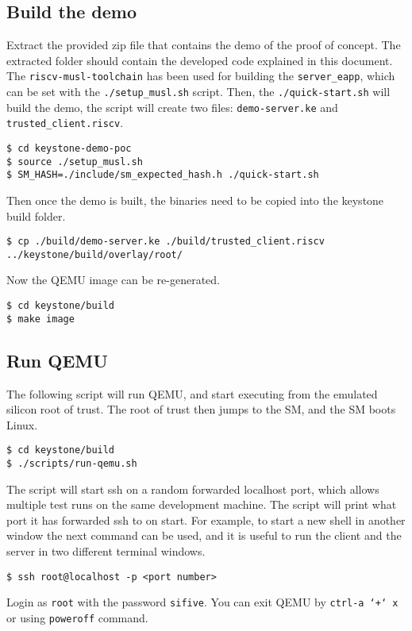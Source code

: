 \subsection{Build the demo}
Extract the provided zip file that contains the demo of the proof of concept. The extracted folder should contain the developed code explained in this document. The \texttt{riscv-musl-toolchain} has been used for building the \texttt{server\_eapp}, which can be set with the \texttt{./setup\_musl.sh} script. Then, the \texttt{./quick-start.sh} will build the demo, the script will create two files: \texttt{demo-server.ke} and \texttt{trusted\_client.riscv}. \\
\begin{lstlisting}[frame=single]
$ cd keystone-demo-poc
$ source ./setup_musl.sh
$ SM_HASH=./include/sm_expected_hash.h ./quick-start.sh
\end{lstlisting}
Then once the demo is built, the binaries need to be copied into the keystone build folder. \\

\begin{lstlisting}[frame=single]
$ cp ./build/demo-server.ke ./build/trusted_client.riscv ../keystone/build/overlay/root/
\end{lstlisting}
Now the QEMU image can be re-generated. \\

\begin{lstlisting}[frame=single]
$ cd keystone/build
$ make image
\end{lstlisting}

\subsection{Run QEMU}
The following script will run QEMU, and start executing from the emulated silicon root of trust. The root of trust then jumps to the SM, and the SM boots Linux. \\
\begin{lstlisting}[frame=single]
$ cd keystone/build
$ ./scripts/run-qemu.sh
\end{lstlisting}
The script will start ssh on a random forwarded localhost port, which allows multiple test runs on the same development machine. The script will print what port it has forwarded ssh to on start. For example, to start a new shell in another window the next command can be used, and it is useful to run the client and the server in two different terminal windows. \\
\begin{lstlisting}[frame=single]
$ ssh root@localhost -p <port number>
\end{lstlisting}
Login as \texttt{\color{RedOrange}root} with the password \texttt{\color{RedOrange}sifive}. You can exit QEMU by \texttt{\color{RedOrange}ctrl-a\ `+`\ x} or using  \texttt{\color{RedOrange}poweroff}  command.

